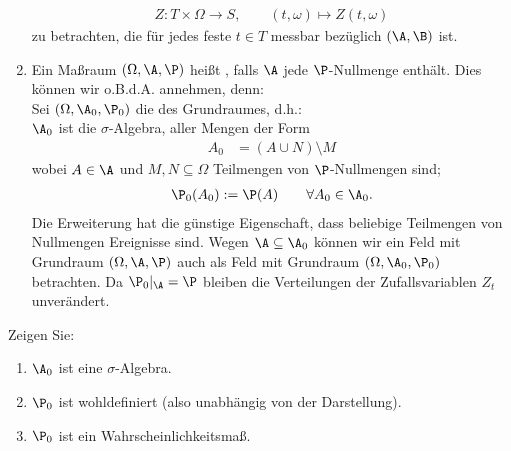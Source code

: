 \begin{bemerkungnr}
\begin{enumerate}[label=(\arabic*)]
		\begin{align*}
			Z:T\times\Omega\to S,\qquad (t,\omega)\mapsto Z(t,\omega)
		\end{align*}
		zu betrachten, die für jedes feste $t\in T$ messbar bezüglich $(\A,\B)$ ist.
		\item Ein Maßraum $(\Omega,\A,\P)$ heißt , falls $\A$ jede $\P$-Nullmenge enthält.\label{item:bemerkung1.3.2(7)}
		Dies können wir o.B.d.A. annehmen, denn:\\
		Sei $(\Omega,\A_0,\P_0)$ die  des Grundraumes, d.h.: \\
		$\A_0$ ist die $\sigma$-Algebra, aller Mengen der Form
		\begin{align*}
			A_0&=(A\cup N)\setminus M
		\end{align*}
		wobei $A\in\A$ und $M,N\subseteq\Omega$ Teilmengen von $\P$-Nullmengen sind;
		\begin{align*}
			\P_0(A_0):=\P(A)\qquad\forall A_0\in\A_0.
		\end{align*}
		Die Erweiterung hat die günstige Eigenschaft, dass beliebige Teilmengen von Nullmengen Ereignisse sind.
		Wegen $\A\subseteq\A_0$ können wir ein Feld mit Grundraum $(\Omega,\A,\P)$ auch als Feld mit Grundraum $(\Omega,\A_0,\P_0)$ betrachten.
		Da $\P_0|_\A=\P$ bleiben die Verteilungen der Zufallsvariablen $Z_t$ unverändert.
	\end{enumerate}
\end{bemerkungnr}

\begin{aufgabenr}\label{aufg:3}\enter
	Zeigen Sie:
	\begin{enumerate}
		\item $\A_0$ ist eine $\sigma$-Algebra.
		\label{item:aufg3_1}
		\item $\P_0$ ist wohldefiniert (also unabhängig von der Darstellung).
		\label{item:aufg3_2}
		\item $\P_0$ ist ein Wahrscheinlichkeitsmaß.
		\label{item:aufg3_3}
	\end{enumerate}
\end{aufgabenr}

